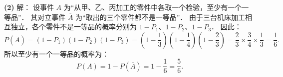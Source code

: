 \begin{answer}
\textbf{(2)} 解：
设事件 $A$ 为“从甲、乙、丙加工的零件中各取一个检验，至少有一个一等品”．
其对立事件 $\overline{A}$ 为“取出的三个零件都不是一等品”．
由于三台机床加工相互独立，各个零件不是一等品的概率分别为 $1 - P_1$、$1 - P_2$、$1 - P_3$．
因此：
\nopagebreak[4]
\[
P(\overline{A}) = (1 - P_1)(1 - P_2)(1 - P_3) = \left(1 - \frac{1}{3}\right)\left(1 - \frac{1}{4}\right)\left(1 - \frac{2}{3}\right) = \frac{2}{3} \times \frac{3}{4} \times \frac{1}{3} = \frac{1}{6}.
\]
所以至少有一个一等品的概率为：
\nopagebreak[4]
\[
P(A) = 1 - P(\overline{A}) = 1 - \frac{1}{6} = \frac{5}{6}.
\]



\end{answer}

